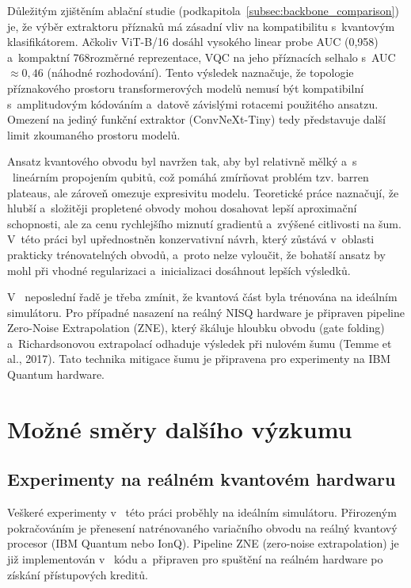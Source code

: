 \documentclass[12pt, a4paper]{report}
\begin{document}
Důležitým zjištěním ablační studie (podkapitola~\ref{subsec:backbone_comparison}) je, že výběr extraktoru příznaků má zásadní vliv na kompatibilitu s~kvantovým klasifikátorem. Ačkoliv ViT-B/16 dosáhl vysokého linear probe AUC (0,958) a~kompaktní 768rozměrné reprezentace, VQC na jeho příznacích selhalo s~AUC $\approx 0{,}46$ (náhodné rozhodování). Tento výsledek naznačuje, že topologie příznakového prostoru transformerových modelů nemusí být kompatibilní s~amplitudovým kódováním a~datově závislými rotacemi použitého ansatzu. Omezení na jediný funkční extraktor (ConvNeXt-Tiny) tedy představuje další limit zkoumaného prostoru modelů.

Ansatz kvantového obvodu byl navržen tak, aby byl relativně mělký a~s ~lineárním propojením qubitů, což pomáhá zmírňovat problém tzv. barren plateaus, ale zároveň omezuje expresivitu modelu. Teoretické práce naznačují, že hlubší a~složitěji propletené obvody mohou dosahovat lepší aproximační schopnosti, ale za cenu rychlejšího miznutí gradientů a~zvýšené citlivosti na šum. V~této práci byl upřednostněn konzervativní návrh, který zůstává v~oblasti prakticky trénovatelných obvodů, a~proto nelze vyloučit, že bohatší ansatz by mohl při vhodné regularizaci a~inicializaci dosáhnout lepších výsledků.

V ~neposlední řadě je třeba zmínit, že kvantová část byla trénována na ideálním simulátoru. Pro případné nasazení na reálný NISQ hardware je připraven pipeline Zero-Noise Extrapolation (ZNE), který škáluje hloubku obvodu (gate folding) a~Richardsonovou extrapolací odhaduje výsledek při nulovém šumu (Temme et al., 2017). Tato technika mitigace šumu je připravena pro experimenty na IBM Quantum hardware.

\section{Možné směry dalšího výzkumu} \label{sec:future_work}

\subsection{Experimenty na reálném kvantovém hardwaru}

Veškeré experimenty v ~této práci proběhly na ideálním simulátoru. Přirozeným pokračováním je přenesení natrénovaného variačního obvodu na reálný kvantový procesor (IBM Quantum nebo IonQ). Pipeline ZNE (zero-noise extrapolation) je již implementován v ~kódu a~připraven pro spuštění na reálném hardware po získání přístupových kreditů.
\end{document}
